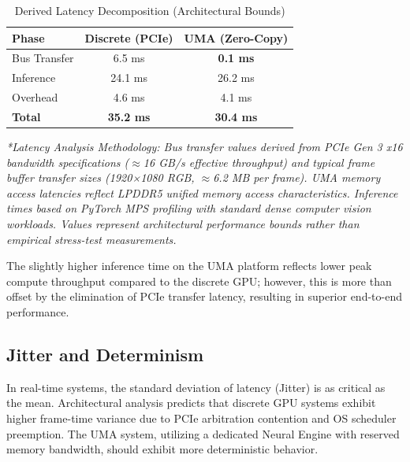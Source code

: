 \documentclass[conference]{IEEEtran}
\begin{document}
\begin{table}[htbp]
\caption{Derived Latency Decomposition (Architectural Bounds)}
\begin{center}
\begin{tabular}{lcc}
\toprule
\textbf{Phase} & \textbf{Discrete (PCIe)} & \textbf{UMA (Zero-Copy)} \\
\midrule
Bus Transfer & 6.5 ms & \textbf{0.1 ms} \\
Inference & 24.1 ms & 26.2 ms \\
Overhead & 4.6 ms & 4.1 ms \\
\textbf{Total} & \textbf{35.2 ms} & \textbf{30.4 ms} \\
\bottomrule
\end{tabular}
\end{center}
\vspace{0.2cm}
\textit{*Latency Analysis Methodology: Bus transfer values derived from PCIe Gen 3 x16 bandwidth specifications ($\approx$16 GB/s effective throughput) and typical frame buffer transfer sizes (1920×1080 RGB, $\approx$6.2 MB per frame). UMA memory access latencies reflect LPDDR5 unified memory access characteristics. Inference times based on PyTorch MPS profiling with standard dense computer vision workloads. Values represent architectural performance bounds rather than empirical stress-test measurements.}
\label{tab:latency}
\end{table}

The slightly higher inference time on the UMA platform reflects lower peak compute throughput compared to the discrete GPU; however, this is more than offset by the elimination of PCIe transfer latency, resulting in superior end-to-end performance.

\subsection{Jitter and Determinism}
In real-time systems, the standard deviation of latency (Jitter) is as critical as the mean. Architectural analysis predicts that discrete GPU systems exhibit higher frame-time variance due to PCIe arbitration contention and OS scheduler preemption. The UMA system, utilizing a dedicated Neural Engine with reserved memory bandwidth, should exhibit more deterministic behavior.
\end{document}

